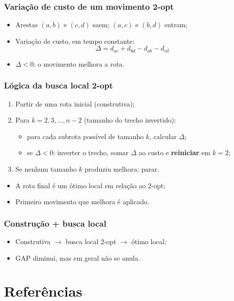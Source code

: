 \documentclass[fleqn]{beamer}
\begin{document}
\begin{frame}
	\frametitle{Variação de custo de um movimento 2-opt}
	\begin{itemize}
		\item Arestas $(a,b)$ e $(c,d)$ saem; $(a,c)$ e $(b,d)$ entram;
		\item Variação de custo, em tempo constante:
			\[
				\Delta = d_{ac} + d_{bd} - d_{ab} - d_{cd}
			\]
		\item $\Delta < 0$: o movimento melhora a rota.
	\end{itemize}
\end{frame}

\begin{frame}
	\frametitle{Lógica da busca local 2-opt}
	\begin{enumerate}
		\item Partir de uma rota inicial (construtiva);
		\item Para $k = 2, 3, \ldots, n-2$ (tamanho do trecho invertido):
			\begin{itemize}
				\item para cada subrota possível de tamanho $k$, calcular $\Delta$;
				\item se $\Delta < 0$: inverter o trecho, somar $\Delta$ ao
					custo e \textbf{reiniciar} em $k = 2$;
			\end{itemize}
		\item Se nenhum tamanho $k$ produziu melhora: parar.
	\end{enumerate}
	\vspace{2mm}
	\begin{itemize}
		\item A rota final é um ótimo local em relação ao 2-opt;
		\item Primeiro movimento que melhora é aplicado.
	\end{itemize}
\end{frame}

\begin{frame}
	\frametitle{Construção + busca local}
	\begin{itemize}
		\item Construtiva $\to$ busca local 2-opt $\to$ ótimo local;
		\item GAP diminui, mas em geral não se anula.
	\end{itemize}
\end{frame}

\section{Referências}
\end{document}

